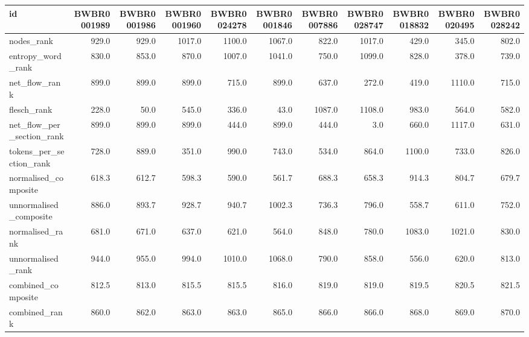 \begin{tabular}{lrrrrrrrrrr}
\toprule
id & BWBR0001989 & BWBR0001986 & BWBR0001960 & BWBR0024278 & BWBR0001846 & BWBR0007886 & BWBR0028747 & BWBR0018832 & BWBR0020495 & BWBR0028242 \\
\midrule
nodes\_rank & 929.0 & 929.0 & 1017.0 & 1100.0 & 1067.0 & 822.0 & 1017.0 & 429.0 & 345.0 & 802.0 \\
\cline{1-11}
entropy\_word\_rank & 830.0 & 853.0 & 870.0 & 1007.0 & 1041.0 & 750.0 & 1099.0 & 828.0 & 378.0 & 739.0 \\
\cline{1-11}
net\_flow\_rank & 899.0 & 899.0 & 899.0 & 715.0 & 899.0 & 637.0 & 272.0 & 419.0 & 1110.0 & 715.0 \\
\cline{1-11}
flesch\_rank & 228.0 & 50.0 & 545.0 & 336.0 & 43.0 & 1087.0 & 1108.0 & 983.0 & 564.0 & 582.0 \\
\cline{1-11}
net\_flow\_per\_section\_rank & 899.0 & 899.0 & 899.0 & 444.0 & 899.0 & 444.0 & 3.0 & 660.0 & 1117.0 & 631.0 \\
\cline{1-11}
tokens\_per\_section\_rank & 728.0 & 889.0 & 351.0 & 990.0 & 743.0 & 534.0 & 864.0 & 1100.0 & 733.0 & 826.0 \\
\cline{1-11}
normalised\_composite & 618.3 & 612.7 & 598.3 & 590.0 & 561.7 & 688.3 & 658.3 & 914.3 & 804.7 & 679.7 \\
\cline{1-11}
unnormalised\_composite & 886.0 & 893.7 & 928.7 & 940.7 & 1002.3 & 736.3 & 796.0 & 558.7 & 611.0 & 752.0 \\
\cline{1-11}
normalised\_rank & 681.0 & 671.0 & 637.0 & 621.0 & 564.0 & 848.0 & 780.0 & 1083.0 & 1021.0 & 830.0 \\
\cline{1-11}
unnormalised\_rank & 944.0 & 955.0 & 994.0 & 1010.0 & 1068.0 & 790.0 & 858.0 & 556.0 & 620.0 & 813.0 \\
\cline{1-11}
combined\_composite & 812.5 & 813.0 & 815.5 & 815.5 & 816.0 & 819.0 & 819.0 & 819.5 & 820.5 & 821.5 \\
\cline{1-11}
combined\_rank & 860.0 & 862.0 & 863.0 & 863.0 & 865.0 & 866.0 & 866.0 & 868.0 & 869.0 & 870.0 \\
\cline{1-11}
\bottomrule
\end{tabular}
